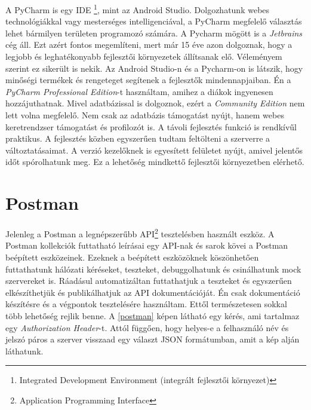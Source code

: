 \documentclass{thesis-ekf}
\theoremstyle{definition}
\theoremstyle{remark}
\begin{document}
A PyCharm is egy IDE \footnote{Integrated Development Environment (integrált fejlesztői környezet)}, mint az Android Studio.
Dolgozhatunk webes technológiákkal vagy mesterséges intelligenciával, a PyCharm megfelelő választás lehet bármilyen területen programozó számára.
A Pycharm mögött is a \emph{Jetbrains} cég áll. Ezt azért fontos megemlíteni, mert már 15 éve azon dolgoznak, hogy a legjobb és leghatékonyabb fejlesztői környezetek állítsanak elő.
Véleményem szerint ez sikerült is nekik. Az Android Studio-n és a Pycharm-on  is látszik, hogy minőségi termékek és rengeteget segítenek a fejlesztők mindennapjaiban.
Én a \emph{PyCharm Professional Edition}-t használtam, amihez a diákok ingyenesen hozzájuthatnak.
Mivel adatbázissal is dolgoznok, ezért a \emph{Community Edition} nem lett volna megfelelő.
Nem csak az adatbázis támogatást nyújt, hanem webes keretrendzser támogatást és profilozót is.
A távoli fejlesztés funkció is rendkívűl praktikus. A fejlesztés közben egyszerűen tudtam feltölteni a szerverre a változtatásaimat.
A verzió kezelőknek is egyesített felületet nyújt, amivel jelentős időt spórolhatunk meg.
Ez a lehetőség mindkettő fejlesztői környezetben elérhető.\cite{pycharm}


\section{Postman}

Jelenleg a Postman a legnépszerűbb API\footnote{Application Programming Interface} tesztelésben használt eszköz.
A Postman kollekciók futtatható leírásai egy API-nak és sarok kövei a Postman beépített eszközeinek.
Ezeknek a beépített eszközöknek köszönhetően futtathatunk hálózati kéréseket, teszteket, debuggolhatunk és csinálhatunk mock szervereket is.
Ráadásul automatizáltan futtathatjuk a teszteket és egyszerűen elkészíthetjük és publikálhatjuk az API dokumentációját.
Én csak dokumentáció készítésre és a végpontok tesztelésére használtam. Ettől természetesen sokkal több lehetőség rejlik benne.
A \ref{postman} képen látható egy kérés, ami tartalmaz egy \emph{Authorization Header}-t.
Attól függően, hogy helyes-e a felhasználó név és jelszó páros a szerver visszaad egy választ JSON formátumban, amit a kép alján láthatunk.
\end{document}
